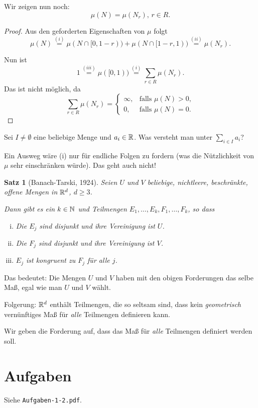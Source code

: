 \documentclass[
 a4paper,
 12pt,
 parskip=half
 ]{scrreprt}
\theoremstyle{plain}
\newtheorem{thm}{Satz}[section] %
\theoremstyle{definition}
\numberwithin{equation}{section}
\begin{document}
Wir zeigen nun noch:
\[ \mu( N ) = \mu(N_r),\, r \in R. \]

\begin{proof}
 Aus den geforderten Eigenschaften von $\mu$ folgt
 \[ \mu(N) \overset{(i)}{=} \mu( N \cap [0,1-r) ) + \mu( N \cap [1-r, 1) ) \overset{(ii)}{=} \mu(N_r). \] 
 
 Nun ist
 \[ 1 \overset{(iii)}{=} \mu( [0,1) ) \overset{(i)}{=} \sum_{r \in R} \mu( N_r ). \]
 Das ist nicht möglich, da
 \[ \sum_{r \in R} \mu( N_r ) = 
   \begin{cases}
    \infty, & \text{falls } \mu(N) > 0, \\
    0, & \text{falls } \mu(N) = 0.
   \end{cases} \]
\end{proof}

Sei $I \ne \emptyset$ eine beliebige Menge und $a_i \in \mathbb{R}$. Was versteht man unter $\sum_{i \in I} a_i$?

Ein Ausweg wäre (i) nur für endliche Folgen zu fordern (was die Nützlichkeit von $\mu$ sehr einschränken würde). Das geht auch nicht!

\begin{thm}[Banach-Tarski, 1924]
 Seien $U$ und $V$ beliebige, nichtleere, beschränkte, offene Mengen in $\mathbb{R}^d$, $d \ge 3$.
 
 Dann gibt es ein $k \in \mathbb{N}$ und Teilmengen $E_1, \ldots, E_k, F_1, \ldots, F_k$, so dass
 \begin{enumerate}[(i)]
  \item Die $E_j$ sind disjunkt und ihre Vereinigung ist $U$.
  \item Die $F_j$ sind disjunkt und ihre Vereinigung ist $V$.
  \item $E_j$ ist kongruent zu $F_j$ für alle $j$.
 \end{enumerate}
\end{thm}

Das bedeutet: Die Mengen $U$ und $V$ haben mit den obigen Forderungen das selbe Maß, egal wie man $U$ und $V$ wählt.

Folgerung: $\mathbb{R}^d$ enthält Teilmengen, die so seltsam sind, dass kein \emph{geometrisch} vernünftiges Maß für \emph{alle} Teilmengen definieren kann.

Wir geben die Forderung auf, dass das Maß für \emph{alle} Teilmengen definiert werden soll.

\section{Aufgaben}
 Siehe \verb+Aufgaben-1-2.pdf+.
\end{document}
